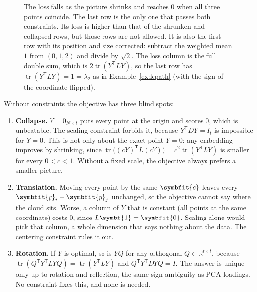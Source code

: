 \documentclass[11pt]{article}
\newcommand{\bm}[1]{\symbfit{#1}}
\newcommand{\R}{\mathbb{R}}
\newcommand{\one}{\symbf{1}}
\newcommand{\T}{^{\mathsf T}}
\newcommand{\tr}{\operatorname{tr}}
\begin{document}
\begin{figure}[htbp]
\caption{The loss falls as the picture shrinks and reaches $0$ when all three points coincide. The last row is the only one that passes both constraints. Its loss is higher than that of the shrunken and collapsed rows, but those rows are not allowed. It is also the first row with its position and size corrected: subtract the weighted mean $1$ from $(0,1,2)$ and divide by $\sqrt2$. The loss column is the full double sum, which is $2\tr(Y\T LY)$, so the last row has $\tr(Y\T LY)=1=\lambda_2$ as in Example~\ref{ex:lepath} (with the sign of the coordinate flipped).}
\label{fig:pullonly}
\end{figure}

Without constraints the objective has three blind spots:
\begin{enumerate}[nosep,label=(\alph*)]
\item \textbf{Collapse.} $Y=0_{N\times t}$ puts every point at the origin and scores $0$, which is unbeatable. The scaling constraint forbids it,
because $Y\T DY=I_t$ is impossible for $Y=0$. This is not only about the exact point $Y=0$: any embedding improves by shrinking, since
$\tr\big((cY)\T L(cY)\big)=c^2\tr(Y\T LY)$ is smaller for every $0<c<1$. Without a fixed scale, the objective always prefers a smaller picture.
\item \textbf{Translation.} Moving every point by the same $\bm c$ leaves every $\bm y_i-\bm y_j$ unchanged, so the objective cannot say where
the cloud sits. Worse, a column of $Y$ that is constant (all points at the same coordinate) costs $0$, since $L\one=\bm0$. Scaling alone would
pick that column, a whole dimension that says nothing about the data. The centering constraint rules it out.
\item \textbf{Rotation.} If $Y$ is optimal, so is $YQ$ for any orthogonal $Q\in\R^{t\times t}$, because $\tr(Q\T Y\T LYQ)=\tr(Y\T LY)$ and
$Q\T Y\T DYQ=I$. The answer is unique only up to rotation and reflection, the same sign ambiguity as PCA loadings. No constraint fixes this,
and none is needed.
\end{enumerate}
\end{document}
